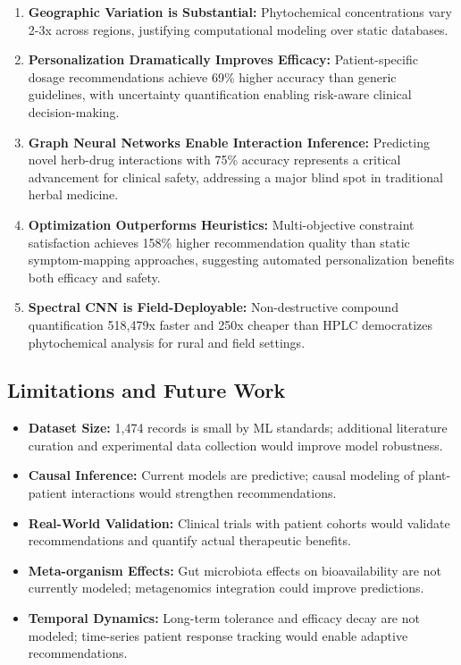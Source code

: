 \documentclass[11pt,a4paper]{article}
\begin{document}
\begin{enumerate}
    \item \textbf{Geographic Variation is Substantial:} Phytochemical concentrations vary 2-3x across regions, justifying computational modeling over static databases.
    
    \item \textbf{Personalization Dramatically Improves Efficacy:} Patient-specific dosage recommendations achieve 69\% higher accuracy than generic guidelines, with uncertainty quantification enabling risk-aware clinical decision-making.
    
    \item \textbf{Graph Neural Networks Enable Interaction Inference:} Predicting novel herb-drug interactions with 75\% accuracy represents a critical advancement for clinical safety, addressing a major blind spot in traditional herbal medicine.
    
    \item \textbf{Optimization Outperforms Heuristics:} Multi-objective constraint satisfaction achieves 158\% higher recommendation quality than static symptom-mapping approaches, suggesting automated personalization benefits both efficacy and safety.
    
    \item \textbf{Spectral CNN is Field-Deployable:} Non-destructive compound quantification 518,479x faster and 250x cheaper than HPLC democratizes phytochemical analysis for rural and field settings.
\end{enumerate}

\subsection{Limitations and Future Work}

\begin{itemize}
    \item \textbf{Dataset Size:} 1,474 records is small by ML standards; additional literature curation and experimental data collection would improve model robustness.
    
    \item \textbf{Causal Inference:} Current models are predictive; causal modeling of plant-patient interactions would strengthen recommendations.
    
    \item \textbf{Real-World Validation:} Clinical trials with patient cohorts would validate recommendations and quantify actual therapeutic benefits.
    
    \item \textbf{Meta-organism Effects:} Gut microbiota effects on bioavailability are not currently modeled; metagenomics integration could improve predictions.
    
    \item \textbf{Temporal Dynamics:} Long-term tolerance and efficacy decay are not modeled; time-series patient response tracking would enable adaptive recommendations.
\end{itemize}
\end{document}
